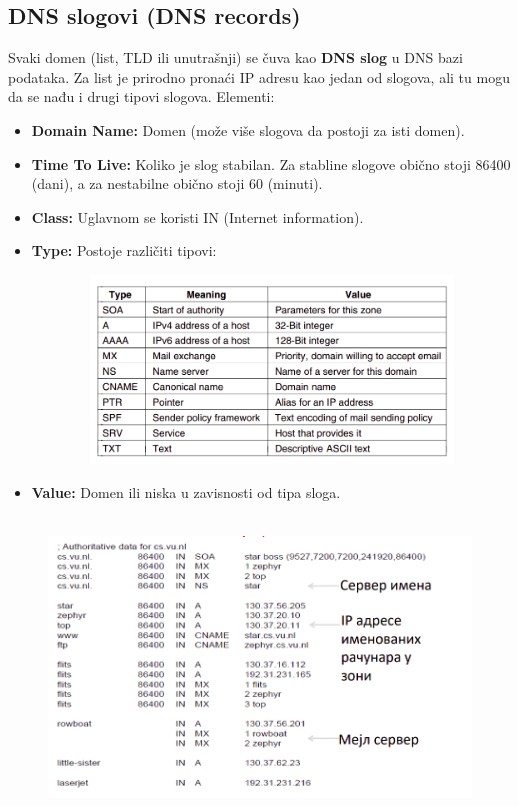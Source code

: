 \documentclass[a4paper]{article}
\begin{document}
    \subsection{DNS slogovi (DNS records)}
        Svaki domen (list, TLD ili unutrašnji) se čuva kao \textbf{DNS slog} u DNS bazi podataka. 
        Za list je prirodno pronaći IP adresu kao jedan od slogova, ali
        tu mogu da se nađu i drugi tipovi slogova. Elementi:
        \begin{itemize}
            \item \textbf{Domain Name:} Domen (može više slogova da postoji za isti domen).
            \item \textbf{Time To Live:} Koliko je slog stabilan. Za stabline slogove obično
                  stoji 86400 (dani), a za nestabilne obično stoji 60 (minuti).
            \item \textbf{Class:} Uglavnom se koristi IN (Internet information).  
            \item \textbf{Type:} Postoje različiti tipovi:
                  \begin{figure}[H]
                      \begin{center}
                          \includegraphics[width=120mm,height=50mm]{Slike/dns2.png}
                      \end{center}
                  \end{figure}
            \item \textbf{Value:} Domen ili niska u zavisnosti od tipa sloga.
        \end{itemize}
        \begin{figure}[H]
            \begin{center}
                \includegraphics[width=120mm,height=80mm]{Slike/dns3.png}
            \end{center}
        \end{figure}
\end{document}
